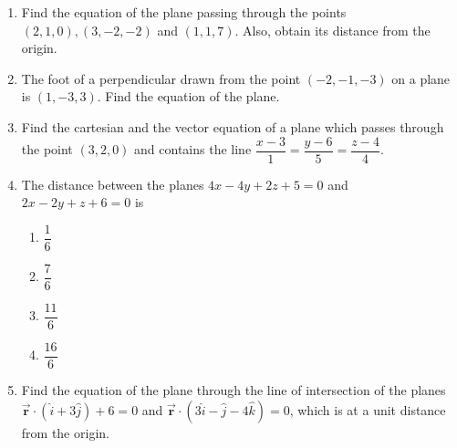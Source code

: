 %
\begin{enumerate}
\item Find the equation of the plane passing through the points $(2,1,0),(3,-2,-2)$ and $(1,1,7)$. Also, obtain its distance from the origin.
\item The foot of a perpendicular drawn from the point $(-2,-1,-3)$ on a plane is $(1,-3,3)$. Find the equation of the plane.
\item Find the cartesian and the vector equation of a plane which passes through the point $(3,2,0)$ and contains the line $\dfrac{x-3}{1}=\dfrac{y-6}{5}=\dfrac{z-4}{4}$.
\item The distance between the planes $4x-4y+2z+5=0$ and $2x-2y+z+6=0$ is
	\begin{enumerate}

	\item $\dfrac{1}{6}$
	\item $\dfrac{7}{6}$
	\item $\dfrac{11}{6}$
	\item $\dfrac{16}{6}$
	\end{enumerate}
	\item Find the equation of the plane through the line of intersection of the planes $\overrightarrow{\textbf{r}}\cdot(\hat{i}+3\hat{j})+6=0$ and $\overrightarrow{\textbf{r}}\cdot(3\hat{i}-\hat{j}-4\hat{k})=0$, which is at a  unit distance from the origin.
\end{enumerate}
%
